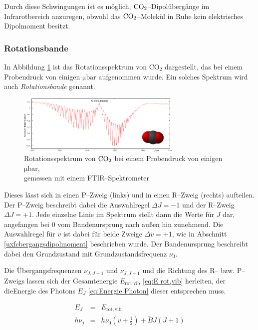 \documentclass[12pt,a4paper]{scrartcl}
\numberwithin{equation}{section} %
\begin{document}
Durch diese Schwingungen ist es möglich, $\ce{CO_2}$--Dipolübergänge im Infrarotbereich anzuregen, obwohl das $\ce{CO_2}$--Molekül  in Ruhe kein elektrisches Dipolmoment besitzt. \cite{HakenWolf} %

\hypertarget{Rotationsbande}{\subsubsection{Rotationsbande}\label{Rotationsbande}}
In Abbildung \ref{fig:rotationsspektrumCO2} ist das Rotationsspektrum von CO$_2$ dargestellt, das bei einem Probendruck von einigen $\mathrm{\mu bar}$ aufgenommen wurde. Ein solches Spektrum wird auch \emph{Rotationsbande} genannt.

\begin{figure}[h!]
  \centering
  \includegraphics[width=0.7\textwidth]{../media/B1.1/Rotationssprektrum_CO2.png}
  \caption{Rotationsspektrum von $\ce{CO_2}$ bei einem Probendruck von einigen $\mathrm{\mu bar}$,\\
    gemessen mit einem FTIR--Spektrometer \cite{UzK}}
  \label{fig:rotationsspektrumCO2}
\end{figure}

Dieses lässt sich in einen P--Zweig (links) und in einen R--Zweig (rechts) aufteilen. Der P--Zweig beschreibt dabei die Auswahlregel $\Delta J = -1$ und der R--Zweig $\Delta J = +1$. Jede einzelne Linie im Spektrum stellt dann die Werte für $J$ dar, angefangen bei $0$ vom Bandenursprung nach außen hin zunehmend. Die Auswahlregel für $v$ ist dabei für beide Zweige $\Delta v = +1$, wie in Abschnitt \ref{uxfcbergangsdipolmoment} beschrieben wurde. Der Bandenursprung beschreibt dabei den Grundzustand mit Grundzustandsfrequenz $\nu_0$.

Die Übergangsfrequenzen $\nu_{J, J+1}$ und $\nu_{J, J-1}$ und die Richtung des R-- bzw. P--Zweigs lassen sich der Gesamtenergie $E_\mathrm{rot,vib}$ \eqref{eq:E rot,vib} herleiten, der dieEnergie des Photons $E_J$ \eqref{eq:Energie Photon} dieser entsprechen muss.

\begin{eqnarray}
  E_J &=& E_\mathrm{rot,vib} \\
  h \nu_j &=& h \nu_0 \left(v + \frac{1}{2}\right) + \tilde{B} J (J + 1)
\end{eqnarray}
\end{document}
